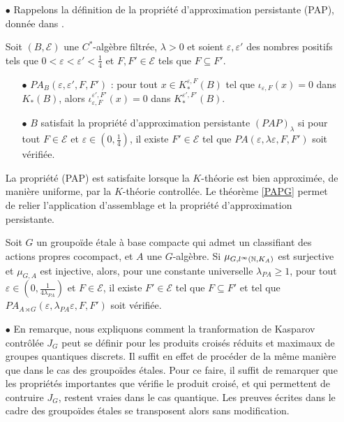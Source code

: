 \begin{itemize}

\item[$\bullet$] Rappelons la définition de la propriété d'approximation persistante (PAP), donnée dans \cite{OY3}.\\

\begin{definitionfr}
Soit $(B,\mathcal E)$ une $C^*$-algèbre filtrée, $\lambda>0$ et soient $\varepsilon,\varepsilon'$ des nombres positifs tels que $0<\varepsilon <\varepsilon' <\frac{1}{4}$ et $F,F'\in\mathcal E$ tels que $F\subseteq F'$. 
\begin{itemize}
\item[$\bullet$] $PA_B(\varepsilon,\varepsilon',F,F')$ : pour tout $x\in K_*^{\varepsilon,F}(B)$ tel que $\iota_{\varepsilon,F}(x)=0$ dans $K_*(B)$, alors $\iota_{\varepsilon,F}^{\varepsilon',F'}(x)=0$ dans $K_*^{\varepsilon',F'}(B)$.
\item[$\bullet$] $B$ satisfait la propriété d'approximation persistante $(PAP)_\lambda$ si pour tout $F\in\mathcal E$ et $\varepsilon\in (0,\frac{1}{4})$, il existe $F'\in\mathcal E$ tel que $PA(\varepsilon,\lambda\varepsilon,F,F')$ soit vérifiée.\\
\end{itemize}
\end{definitionfr}

La propriété (PAP) est satisfaite lorsque la $K$-théorie est bien approximée, de manière uniforme, par la $K$-théorie controllée. Le théorème \ref{PAPG} permet de relier l'application d'assemblage et la propriété d'approximation persistante. \\

\begin{thmfr} 
Soit $G$ un groupoïde étale à base compacte qui admet un classifiant des actions propres cocompact, et $A$ une $G$-algèbre. Si $\mu_{G,l^\infty(\mathbb N, K_A)}$ est surjective et $\mu_{G,A}$ est injective, alors, pour une constante universelle $\lambda_{PA}\geq 1$, pour tout $\varepsilon \in(0,\frac{1}{4\lambda_{PA}})$ et $F\in\mathcal E$, il existe $F'\in\mathcal E$ tel que $F\subseteq F'$ et tel que $PA_{A\rtimes G}(\varepsilon,\lambda_{PA}\varepsilon,F,F')$ soit vérifiée.\\
\end{thmfr}

\item[$\bullet$] En remarque, nous expliquons comment la tranformation de Kasparov contrôlée $J_G$ peut se définir pour les produits croisés réduits et maximaux de groupes quantiques discrets. Il suffit en effet de procéder de la même manière que dans le cas des groupoïdes étales. Pour ce faire, il suffit de remarquer que les propriétés importantes que vérifie le produit croisé, et qui permettent de contruire $J_G$, restent vraies dans le cas quantique. Les preuves écrites dans le cadre des groupoïdes étales se transposent alors sans modification.\\


\end{itemize}
